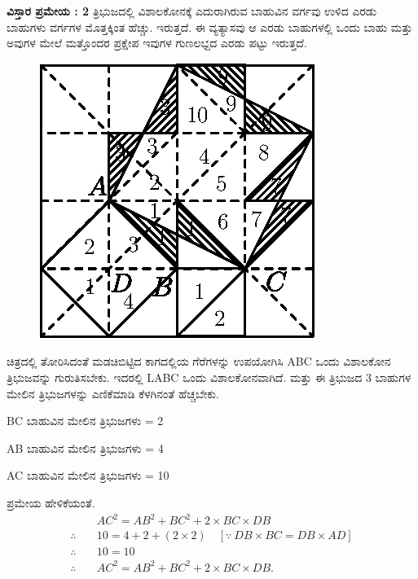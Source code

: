 \medskip
\noindent
\textbf{ವಿಸ್ತಾರ ಪ್ರಮೇಯ : 2}
ತ್ರಿಭುಜದಲ್ಲಿ ವಿಶಾಲಕೋನಕ್ಕೆ ಎದುರಾಗಿರುವ ಬಾಹುವಿನ ವರ್ಗವು ಉಳಿದ ಎರಡು ಬಾಹುಗಳು ವರ್ಗಗಳ ಮೊತ್ತಕ್ಕಿಂತ ಹೆಚ್ಚು. ಇರುತ್ತದೆ. ಈ ವ್ಯತ್ಯಾಸವು ಆ ಎರಡು ಬಾಹುಗಳಲ್ಲಿ ಒಂದು ಬಾಹು ಮತ್ತು ಅವುಗಳ ಮೇಲೆ ಮತ್ತೊಂದರ ಪ್ರಕ್ಷೇಪ ಇವುಗಳ ಗುಣಲಭ್ದದ ಎರಡು ಪಟ್ಟು ಇರುತ್ತದೆ. 
\begin{figure}[H]
\centering
\includegraphics[scale=.98]{src/figure/chap1/fig1-17g.eps}
\end{figure}

ಚಿತ್ರದಲ್ಲಿ ತೋರಿಸಿದಂತೆ ಮಡಚಿಬಿಟ್ಟಿದ ಕಾಗದಲ್ಲಿಯ ಗೆರೆಗಳನ್ನು ಉಪಯೋಗಿಸಿ ABC ಒಂದು ವಿಶಾಲಕೋನ ತ್ರಿಭುಜವನ್ನು ಗುರುತಿಸಬೇಕು. ಇದರಲ್ಲಿ LABC ಒಂದು ವಿಶಾಲಕೋನವಾಗಿದೆ. ಮತ್ತು ಈ ತ್ರಿಭುಜದ 3 ಬಾಹುಗಳ ಮೇಲಿನ ತ್ರಿಭುಜಗಳನ್ನು ಎಣಿಕೆಮಾಡಿ ಕೆಳಗಿನಂತೆ ಹೆಚ್ಚಬೇಕು.

BC ಬಾಹುವಿನ ಮೇಲಿನ ತ್ರಿಭುಜಗಳು = 2

AB ಬಾಹುವಿನ ಮೇಲಿನ ತ್ರಿಭುಜಗಳು = 4

AC ಬಾಹುವಿನ ಮೇಲಿನ ತ್ರಿಭುಜಗಳು = 10

ಪ್ರಮೇಯ ಹೇಳಿಕೆಯಂತೆ. 
\begin{align*}
& AC^2  = AB^2 + BC^2 +  2 \times BC \times DB\\
\therefore \quad & 10  = 4 +2  + (2 \times 2) \quad [\because ~ DB \times BC = DB \times AD]\\
\therefore \quad & 10  = 10\\
\therefore \quad & AC^2  = AB^2 + BC^2 + 2 \times BC \times DB.
\end{align*}

